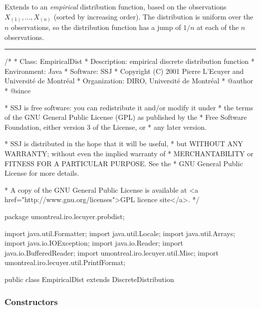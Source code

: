 
Extends  to an \emph{empirical}
distribution function,
based on the observations $X_{(1)},\dots,X_{(n)}$ (sorted by increasing order).
The distribution is uniform over the $n$ observations, so the
distribution function has a jump of $1/n$ at each of the $n$ observations.


\bigskip\hrule

\begin{code}
\begin{hide}
/*
 * Class:        EmpiricalDist
 * Description:  empirical discrete distribution function
 * Environment:  Java
 * Software:     SSJ
 * Copyright (C) 2001  Pierre L'Ecuyer and Université de Montréal
 * Organization: DIRO, Université de Montréal
 * @author
 * @since

 * SSJ is free software: you can redistribute it and/or modify it under
 * the terms of the GNU General Public License (GPL) as published by the
 * Free Software Foundation, either version 3 of the License, or
 * any later version.

 * SSJ is distributed in the hope that it will be useful,
 * but WITHOUT ANY WARRANTY; without even the implied warranty of
 * MERCHANTABILITY or FITNESS FOR A PARTICULAR PURPOSE.  See the
 * GNU General Public License for more details.

 * A copy of the GNU General Public License is available at
   <a href="http://www.gnu.org/licenses">GPL licence site</a>.
 */
\end{hide}
package umontreal.iro.lecuyer.probdist;\begin{hide}

import java.util.Formatter;
import java.util.Locale;
import java.util.Arrays;
import java.io.IOException;
import java.io.Reader;
import java.io.BufferedReader;
import umontreal.iro.lecuyer.util.Misc;
import umontreal.iro.lecuyer.util.PrintfFormat;
\end{hide}

public class EmpiricalDist extends DiscreteDistribution\begin{hide} {
   private int n = 0;
   private double sampleMean;
   private double sampleVariance;
   private double sampleStandardDeviation;
\end{hide}
\end{code}
\subsubsection* {Constructors}

